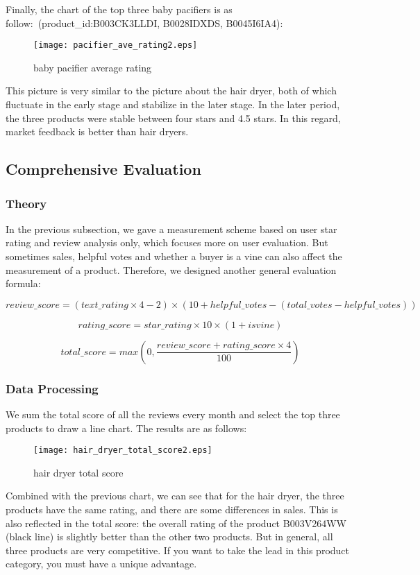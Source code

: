 \documentclass{mcmthesis}
\begin{document}
	Finally, the chart of the top three baby pacifiers is as follow:\ (product\_id:B003CK3LLDI, B0028IDXDS, B0045I6IA4):
	\begin{figure}[H]
		\small
		\centering
		\texttt{[image: pacifier\_ave\_rating2.eps]}
		\caption{baby pacifier average rating} \label{fig:pacifier average rating}
	\end{figure}
	This picture is very similar to the picture about the hair dryer, both of which fluctuate in the early stage and stabilize in the later stage. In the later period, the three products were stable between four stars and 4.5 stars. In this regard, market feedback is better than hair dryers.
	
	\subsection{Comprehensive Evaluation}
	\subsubsection{Theory}
	In the previous subsection, we gave a measurement scheme based on user star rating and review analysis only, which focuses more on user evaluation. But sometimes sales, helpful votes and whether a buyer is a vine can also affect the measurement of a product. Therefore, we designed another general evaluation formula:
	
	$$review\_score=(text\_rating\times4-2)\times(10+helpful\_votes-(total\_votes-helpful\_votes))$$
	
	$$rating\_score=star\_rating\times10\times(1+isvine)$$
	
	$$total\_score=max(0,\frac{review\_score+rating\_score\times4}{100})$$
	
	\subsubsection{Data Processing}
	We sum the total score of all the reviews every month and select the top three products to draw a line chart. The results are as follows:
	
	\begin{figure}[H]
		\small
		\centering
		\texttt{[image: hair\_dryer\_total\_score2.eps]}
		\caption{hair dryer total score} \label{fig:hair dryer total score}
	\end{figure}
	
	Combined with the previous chart, we can see that for the hair dryer, the three products have the same rating, and there are some differences in sales. This is also reflected in the total score: the overall rating of the product B003V264WW (black line) is slightly better than the other two products. But in general, all three products are very competitive. If you want to take the lead in this product category, you must have a unique advantage.
	
\end{document}
